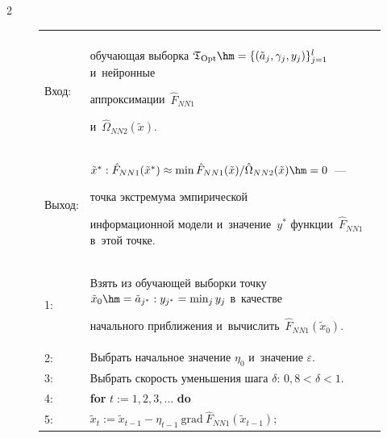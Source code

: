 \begin{multicols}{2}
\begin{figure}
{\small 


\begin{center}


\begin{tabular}{lp{130mm}}


\hline


&\\[-9pt]


Вход: & обучающая выборка $\mathfrak{T}_{\mathrm{Opt}}


\hm=\{ (\tilde{a}_j,\gamma_j,y_j)\}_{j=1}^l$ и~нейронные 


аппроксимации~$\hat{F}_{NN1}$


и~$\hat{\Omega}_{NN2}(\tilde{x})$.\\


Выход: &


$\tilde{x}^{*}: \hat{F}_{NN1}(\tilde{x}^{*})\approx 


\min \hat{F}_{NN1}(\tilde{x}) /\hat{\Omega}_{NN2}(\tilde{x})\hm = 0$~--- 


точка экстремума эмпирической


информационной модели и~значение~$y^{*}$ функции~$\hat{F}_{NN1}$ в~этой точке.\\


\hline


\hphantom{9}1: &Взять из обучающей выборки точку $\tilde{x}_0\hm=\tilde{a}_{j^{*}}: 


y_{j^{*}}= \min_j y_j$  в~качестве


начального приближения и~вычислить~$\hat{F}_{NN1}(\tilde{x}_{0}) $.


\\


\hphantom{9}2: &Выбрать начальное значение $\eta_0$ и~значение $\varepsilon$.


\\


\hphantom{9}3: &Выбрать скорость уменьшения шага $\delta$: $0{,}8 < \delta <1$.


\\


\hphantom{9}4: &\textbf{for} $t:= 1,2, 3,\dots $ \textbf{do}


\\


\hphantom{9}5: &\hspace*{5mm}$ \tilde{x}_t:=\tilde{x}_{t-1} -\eta_{t-1} \ 


\mathrm{grad} \ \hat{F}_{NN1}(\tilde{x}_{t-1}) $;\\



\end{tabular}
\end{center}}
\end{figure}
\end{multicols}
